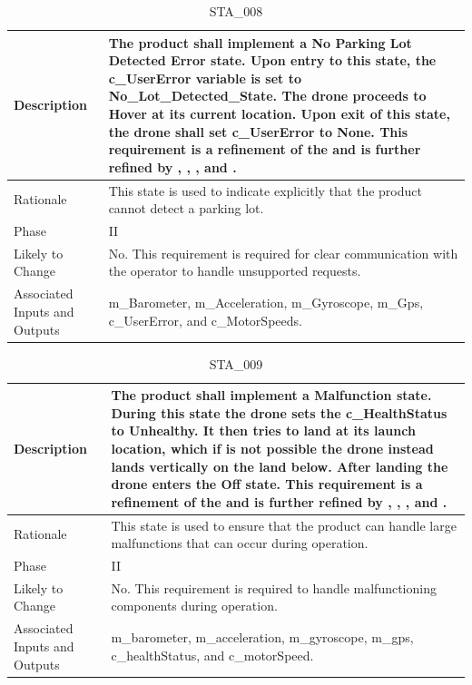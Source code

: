 \documentclass{article}
\begin{document}
\begin{table}[!h]
\begin{center}
\caption {STA\_008} 
\label{STA_008}
\begin{tabular}{ | m{3cm} | m{11cm} | }
\hline
Description & The product shall implement a No Parking Lot Detected Error state. Upon entry to this state, the c\_UserError variable is set to No_Lot_Detected_State. The drone proceeds to Hover at its current location. Upon exit of this state, the drone shall set c\_UserError to None. This requirement is a refinement of the \nameref{No Parking Lot Detected Error State} and is further refined by \nameref{PERF_007}, \nameref{SAFE_001}, \nameref{SAFE_003}, and \nameref{USE_003}. \\
\hline
Rationale & This state is used to indicate explicitly that the product cannot detect a parking lot. \\
\hline
Phase & II \\
\hline
Likely to Change & No. This requirement is required for clear communication with the operator to handle unsupported requests. \\
\hline
Associated Inputs and Outputs & m\_Barometer, m\_Acceleration, m\_Gyroscope, m\_Gps, c\_UserError, and c\_MotorSpeeds. \\
\hline
\end{tabular}
\end{center}
\end{table}

\begin{table}[!h]
\begin{center}
\caption {STA\_009} 
\label{STA_009}
\begin{tabular}{ | m{3cm} | m{11cm} | }
\hline
Description & The product shall implement a Malfunction state. During this state the drone sets the c\_HealthStatus to Unhealthy. It then tries to land at its launch location, which if is not possible the drone instead lands vertically on the land below. After landing the drone enters the Off state. This requirement is a refinement of the \nameref{Malfunction State} and is further refined by \nameref{PERF_007}, \nameref{SAFE_001}, \nameref{SAFE_003}, and \nameref{USE_003}. \\
\hline
Rationale & This state is used to ensure that the product can handle large malfunctions that can occur during operation. \\
\hline
Phase & II \\
\hline
Likely to Change & No. This requirement is required to handle malfunctioning components during operation. \\
\hline
Associated Inputs and Outputs & m\_barometer, m\_acceleration, m\_gyroscope, m\_gps, c\_healthStatus, and c\_motorSpeed. \\
\hline
\end{tabular}
\end{center}
\end{table}
\end{document}
